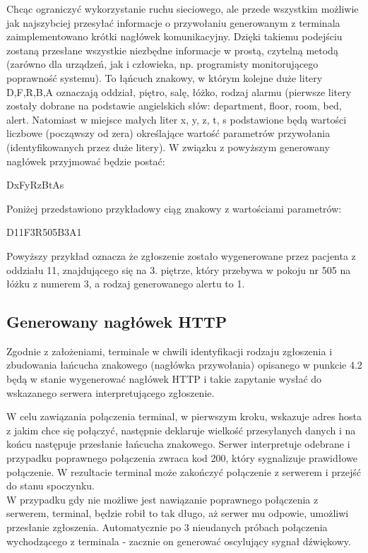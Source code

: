 \documentclass[12pt]{article} %
\begin{document}
Chcąc ograniczyć wykorzystanie ruchu sieciowego, ale przede wszystkim możliwie jak najszybciej przesyłać informacje o przywołaniu generowanym z terminala zaimplementowano krótki nagłówek komunikacyjny. Dzięki takiemu podejściu zostaną przesłane wszystkie niezbędne informacje w prostą, czytelną metodą (zarówno dla urządzeń, jak i człowieka, np. programisty monitorującego poprawność systemu). To łąńcuch znakowy, w którym kolejne duże litery D,F,R,B,A oznaczają oddział, piętro, salę, łóżko, rodzaj alarmu (pierwsze litery zostały dobrane na podstawie angielskich słów: department, floor, room, bed, alert. Natomiast w miejsce małych liter x, y, z, t, s podstawione będą wartości liczbowe (począwszy od zera) określające wartość parametrów przywołania (identyfikowanych przez duże litery). W związku z powyższym generowany nagłówek przyjmować będzie postać:
\begin{center}
DxFyRzBtAs
\end{center}
Poniżej przedstawiono przykładowy ciąg znakowy z wartościami parametrów:

\begin{center}
D11F3R505B3A1
\end{center}
Powyższy przykład oznacza że zgłoszenie zostało wygenerowane przez pacjenta z oddziału 11, znajdującego się na 3. piętrze, który przebywa w pokoju nr 505 na łóżku z numerem 3, a rodzaj  generowanego alertu to 1.

\subsection{Generowany nagłówek HTTP}

Zgodnie z założeniami, terminale w chwili identyfikacji rodzaju zgłoszenia i zbudowania łańcucha znakowego (nagłówka przywołania) opisanego w punkcie 4.2 będą w stanie wygenerować nagłówek HTTP i takie zapytanie wysłać do wskazanego serwera interpretującego zgłoszenie. 

W celu zawiązania połączenia terminal, w pierwszym kroku, wskazuje adres hosta z jakim chce się połączyć, następnie deklaruje wielkość przesyłanych danych i na końcu następuje przesłanie łańcucha znakowego. Serwer interpretuje odebrane i przypadku poprawnego połączenia zwraca kod 200, który sygnalizuje prawidłowe połączenie. W rezultacie terminal może zakończyć połączenie z serwerem i przejść do stanu spoczynku.
\\
W przypadku gdy nie możliwe jest nawiązanie poprawnego połączenia z serwerem, terminal, będzie robił to tak długo, aż serwer mu odpowie, umożliwi przesłanie zgłoszenia. Automatycznie po 3 nieudanych próbach połączenia wychodzącego z terminala - zacznie on generować oscylujący sygnał dźwiękowy.
\end{document}
